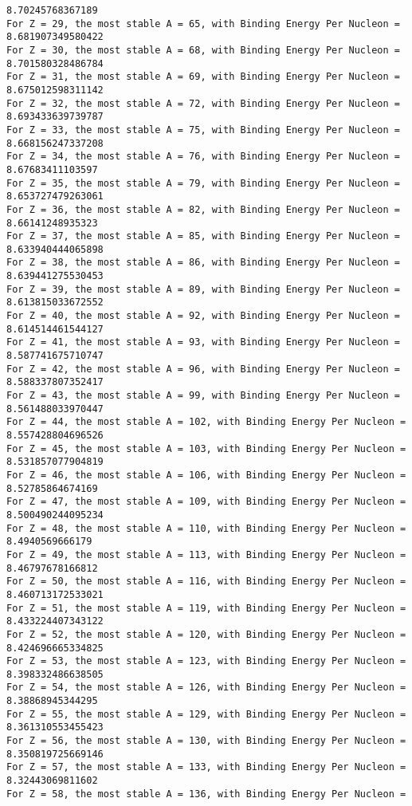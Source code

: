 \documentclass[11pt]{article}
\begin{document}
\begin{Verbatim}[commandchars=\\\{\}]
8.70245768367189
For Z = 29, the most stable A = 65, with Binding Energy Per Nucleon =
8.681907349580422
For Z = 30, the most stable A = 68, with Binding Energy Per Nucleon =
8.701580328486784
For Z = 31, the most stable A = 69, with Binding Energy Per Nucleon =
8.675012598311142
For Z = 32, the most stable A = 72, with Binding Energy Per Nucleon =
8.693433639739787
For Z = 33, the most stable A = 75, with Binding Energy Per Nucleon =
8.668156247337208
For Z = 34, the most stable A = 76, with Binding Energy Per Nucleon =
8.67683411103597
For Z = 35, the most stable A = 79, with Binding Energy Per Nucleon =
8.653727479263061
For Z = 36, the most stable A = 82, with Binding Energy Per Nucleon =
8.66141248935323
For Z = 37, the most stable A = 85, with Binding Energy Per Nucleon =
8.633940444065898
For Z = 38, the most stable A = 86, with Binding Energy Per Nucleon =
8.639441275530453
For Z = 39, the most stable A = 89, with Binding Energy Per Nucleon =
8.613815033672552
For Z = 40, the most stable A = 92, with Binding Energy Per Nucleon =
8.614514461544127
For Z = 41, the most stable A = 93, with Binding Energy Per Nucleon =
8.587741675710747
For Z = 42, the most stable A = 96, with Binding Energy Per Nucleon =
8.588337807352417
For Z = 43, the most stable A = 99, with Binding Energy Per Nucleon =
8.561488033970447
For Z = 44, the most stable A = 102, with Binding Energy Per Nucleon =
8.557428804696526
For Z = 45, the most stable A = 103, with Binding Energy Per Nucleon =
8.531857077904819
For Z = 46, the most stable A = 106, with Binding Energy Per Nucleon =
8.52785864674169
For Z = 47, the most stable A = 109, with Binding Energy Per Nucleon =
8.500490244095234
For Z = 48, the most stable A = 110, with Binding Energy Per Nucleon =
8.4940569666179
For Z = 49, the most stable A = 113, with Binding Energy Per Nucleon =
8.46797678166812
For Z = 50, the most stable A = 116, with Binding Energy Per Nucleon =
8.460713172533021
For Z = 51, the most stable A = 119, with Binding Energy Per Nucleon =
8.433224407343122
For Z = 52, the most stable A = 120, with Binding Energy Per Nucleon =
8.424696665334825
For Z = 53, the most stable A = 123, with Binding Energy Per Nucleon =
8.398332486638505
For Z = 54, the most stable A = 126, with Binding Energy Per Nucleon =
8.38868945344295
For Z = 55, the most stable A = 129, with Binding Energy Per Nucleon =
8.361310553455423
For Z = 56, the most stable A = 130, with Binding Energy Per Nucleon =
8.350819725669146
For Z = 57, the most stable A = 133, with Binding Energy Per Nucleon =
8.32443069811602
For Z = 58, the most stable A = 136, with Binding Energy Per Nucleon =

\end{Verbatim}
\end{document}

